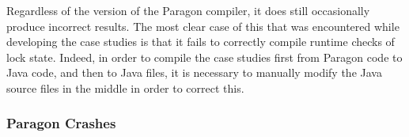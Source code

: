 Regardless of the version of the Paragon compiler, it does still occasionally produce incorrect results. The most clear case of this that was encountered while developing the case studies is that it fails to correctly compile runtime checks of lock state. Indeed, in order to compile the case studies first from Paragon code to Java code, and then to Java  files, it is necessary to manually modify the Java source files in the middle in order to correct this.

\subsubsection{Paragon Crashes}